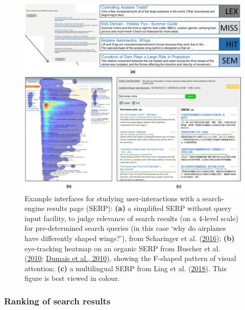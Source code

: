 \documentclass[letterpaper, nobind]{templates/ociamthesis}
\begin{document}
\begin{figure}

{\centering \includegraphics[width=1\linewidth]{figs/int-L-serp} 

}

\caption[Interfaces for studying user-interactions with search-engine results.]{Example interfaces for studying user-interactions with a search-engine results page (SERP): \textbf{(a)} a simplified SERP without query input facility, to judge relevance of search results (on a 4-level scale) for pre-determined search queries (in this case `why do airplanes have differently shaped wings?'), from Scharinger et al. (\protect\hyperlink{ref-63}{2016}); \textbf{(b)} eye-tracking heatmap on an organic SERP from Buscher et al. (\protect\hyperlink{ref-115}{2010}; \protect\hyperlink{ref-117}{Dumais et al., 2010}), showing the F-shaped pattern of visual attention; \textbf{(c)} a multilingual SERP from Ling et al. (\protect\hyperlink{ref-132}{2018}). This figure is best viewed in colour.}\label{fig:int-L-serp}
\end{figure}





\hypertarget{ranking-of-search-results}{%
\subsubsection{Ranking of search results}\label{ranking-of-search-results}}
\end{document}
